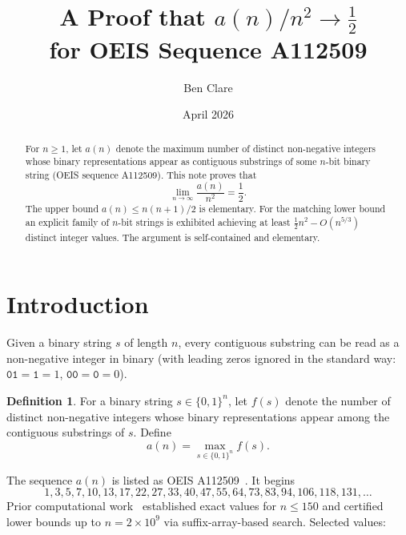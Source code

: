 \documentclass[12pt,a4paper]{article}
\title{A Proof that $a(n)/n^2 \to \tfrac{1}{2}$\\
       for OEIS Sequence A112509}
\author{Ben Clare}
\date{April 2026}
\theoremstyle{plain}
\theoremstyle{definition}
\newtheorem{definition}[theorem]{Definition}
\theoremstyle{remark}
\begin{document}

\maketitle

\begin{abstract}
For $n \ge 1$, let $a(n)$ denote the maximum number of distinct
non-negative integers whose binary representations appear as contiguous
substrings of some $n$-bit binary string (OEIS sequence A112509).
This note proves that
\[
  \lim_{n \to \infty} \frac{a(n)}{n^2} = \frac{1}{2}.
\]
The upper bound $a(n) \le n(n+1)/2$ is elementary.  For the matching
lower bound an explicit family of $n$-bit strings is exhibited achieving
at least $\frac{1}{2}n^2 - O(n^{5/3})$ distinct integer values.  The
argument is self-contained and elementary.
\end{abstract}

\section{Introduction}

Given a binary string $s$ of length $n$, every contiguous substring can
be read as a non-negative integer in binary (with leading zeros ignored
in the standard way: $\texttt{01} = \texttt{1} = 1$, $\texttt{00} =
\texttt{0} = 0$).

\begin{definition}
  For a binary string $s \in \{0,1\}^n$, let $f(s)$ denote the number
  of distinct non-negative integers whose binary representations appear
  among the contiguous substrings of $s$.  Define
  \[
    a(n) = \max_{s \in \{0,1\}^n} f(s).
  \]
\end{definition}

The sequence $a(n)$ is listed as OEIS A112509~\cite{oeis}.  It begins
\[
  1, 3, 5, 7, 10, 13, 17, 22, 27, 33, 40, 47, 55, 64, 73, 83, 94, 106,
  118, 131, \ldots
\]
Prior computational work~\cite{github} established exact values for
$n \le 150$ and certified lower bounds up to $n = 2 \times 10^9$ via
suffix-array-based search.  Selected values:
\end{document}
